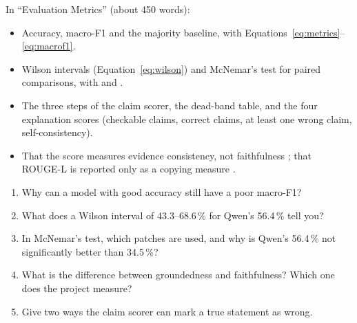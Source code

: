 \begin{foryourreport}
In ``Evaluation Metrics'' (about 450 words):
\begin{itemize}
  \item Accuracy, macro-F1 and the majority baseline, with Equations~\ref{eq:metrics}--\ref{eq:macrof1}.
  \item Wilson intervals (Equation~\ref{eq:wilson}) and McNemar's test for paired comparisons, with \citet{wilson1927} and \citet{mcnemar1947}.
  \item The three steps of the claim scorer, the dead-band table, and the four explanation scores (checkable claims, correct claims, at least one wrong claim, self-consistency).
  \item That the score measures evidence consistency, not faithfulness \citep{jacovi2020}; that ROUGE-L is reported only as a copying measure \citep{lin2004rouge}.
\end{itemize}
\end{foryourreport}

\begin{selfcheck}
\begin{enumerate}
  \item Why can a model with good accuracy still have a poor macro-F1?
  \item What does a Wilson interval of 43.3--68.6\,\% for Qwen's 56.4\,\% tell you?
  \item In McNemar's test, which patches are used, and why is Qwen's 56.4\,\% not significantly better than 34.5\,\%?
  \item What is the difference between groundedness and faithfulness? Which one does the project measure?
  \item Give two ways the claim scorer can mark a true statement as wrong.
\end{enumerate}
\end{selfcheck}
